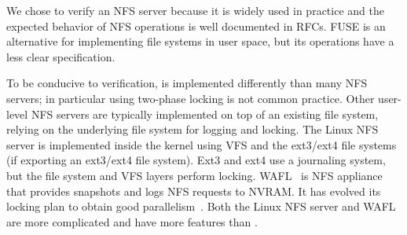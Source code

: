 We chose to verify an NFS server because it is widely used in practice
and the expected behavior of NFS operations is well documented in
RFCs.  FUSE is an alternative for implementing file systems in user
space, but its operations have a less clear specification.

To be conducive to verification, \sys is implemented differently than
many NFS servers; in particular using two-phase locking is not common
practice.  Other user-level NFS servers are typically implemented on
top of an existing file system, relying on the underlying file system
for logging and locking. The Linux NFS server is implemented inside
the kernel using VFS and the ext3/ext4 file systems (if exporting an
ext3/ext4 file system).  Ext3 and ext4 use a journaling system, but
the file system and VFS layers perform locking.  WAFL~\cite{wafl:hitz}
is NFS appliance that provides snapshots and logs NFS requests to
NVRAM.  It has evolved its locking plan to obtain good
parallelism~\cite{curtis:wafl}.  Both the Linux NFS server and WAFL
are more complicated and have more features than \sys.

